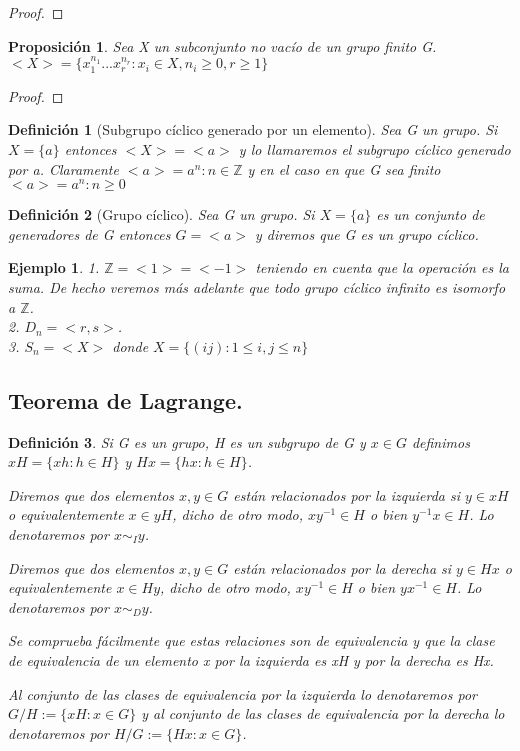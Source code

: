 \documentclass{article}
\theoremstyle{theorem-style}  %
\newtheorem{proposition}[theorem]{Proposición}
\theoremstyle{definition-style}
\newtheorem{definition}{Definición}[section]
\theoremstyle{example-style}
\newtheorem{example}{Ejemplo}[section]
\begin{document}
\begin{proof}

\end{proof}

\begin{proposition}
Sea X un subconjunto no vacío de un grupo finito G. $<X> = \{x_1^{n_1}...x_r^{n_r}:x_i \in X,n_i \ge 0,r \ge 1\}$
\end{proposition}

\begin{proof}

\end{proof}

\begin{definition}[Subgrupo cíclico generado por un elemento]
Sea G un grupo. Si $X = \{a\}$ entonces $<X> = <a>$ y lo llamaremos el subgrupo cíclico generado por a. Claramente $<a> = {a^n : n \in \mathbb{Z}}$ y en el caso en que G sea finito $<a> = {a^n : n \ge 0}$
\end{definition}

\begin{definition}[Grupo cíclico]
Sea G un grupo. Si $X = \{a\}$ es un conjunto de generadores de G entonces $G = <a>$ y diremos que G es un grupo cíclico.
\end{definition}

\begin{example}
1. $\mathbb{Z} = <1> = <-1>$ teniendo en cuenta que la operación es la suma. De hecho veremos más adelante que todo grupo cíclico infinito es isomorfo a $\mathbb{Z}$.\\
2. $D_n = <r,s>$. \\
3. $S_n = <X>$ donde $X = \{(ij):1 \le i,j \le n\}$
\end{example}

\subsection{Teorema de Lagrange.}

\begin{definition}
Si G es un grupo, H es un subgrupo de G y $x \in G$ definimos $xH = \{xh:h \in H\}$ y $Hx = \{hx:h \in H\}$.

Diremos que dos elementos $x,y \in G$ están relacionados por la izquierda si $y \in xH$ o equivalentemente $x \in yH$, dicho de otro modo, $xy^{-1} \in H$ o bien $y^{-1}x \in H$. Lo denotaremos por $x \sim_{I} y$.

Diremos que dos elementos $x,y \in G$ están relacionados por la derecha si $y \in Hx$ o equivalentemente $x \in Hy$, dicho de otro modo, $xy^{-1} \in H$ o bien $yx^{-1} \in H$. Lo denotaremos por $x \sim_{D} y$.

Se comprueba fácilmente que estas relaciones son de equivalencia y que la clase de equivalencia de un elemento x por la izquierda es xH y por la derecha es Hx.

Al conjunto de las clases de equivalencia por la izquierda lo denotaremos por $G/H := \{xH : x \in G \}$ y al conjunto de las clases de equivalencia por la derecha lo denotaremos por $H/G := \{Hx : x \in G \}$.
\end{definition}
\end{document}
